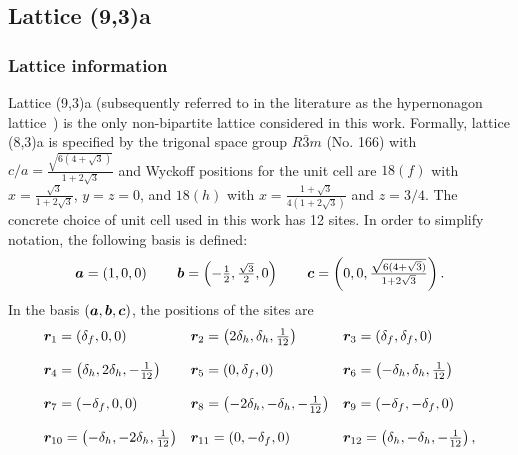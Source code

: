 %
%
\subsection{Lattice (9,3)a}
\label{section:chapter05_9_3a}
%
%
\subsubsection{Lattice information}
%
%
Lattice (9,3)a (subsequently referred to in the literature as the hypernonagon lattice~\cite{YasuyukiPRB2017,KatoPB2018,MasahikoPRL2018}) is the only non-bipartite lattice considered in this work.
Formally, lattice (8,3)a is specified by the trigonal space group $R\bar{3}m$ (No. 166) with $c/a = \frac{\sqrt{6(4 + \sqrt{3})}}{1 + 2\sqrt{3}}$ and Wyckoff positions for the unit cell are $18(f)$ with $x = \frac{\sqrt{3}}{1 + 2\sqrt{3}}$, $y = z = 0$, and $18(h)$ with $x = \frac{1 + \sqrt{3}}{4(1 + 2\sqrt{3})}$ and $z = 3/4$.
The concrete choice of unit cell used in this work has 12 sites.
In order to simplify notation, the following basis is defined:
%
\begin{equation}
	\begin{matrix*}[l]
		\ba = \left(1, 0, 0\right) \qquad
		\bb = \left(-\frac{1}{2}, \frac{\sqrt{3}}{2}, 0\right) \qquad
		\bc = \left(0, 0, \frac{\sqrt{6(4 + \sqrt{3})}}{1 + 2\sqrt{3}}\right).
	\end{matrix*}
\end{equation}
%
In the basis $(\bm{a}, \bm{b}, \bm{c})$, the positions of the sites are
%
\begin{equation}
	\begin{matrix*}[l]
		\br_{1} = \left(\delta_f, 0, 0\right) &
		\br_{2} = \left(2\delta_h, \delta_h, \frac{1}{12}\right) &
		\br_{3} = \left(\delta_f, \delta_f, 0\right) \\
		&\\
		\br_{4} = \left(\delta_h, 2\delta_h, -\frac{1}{12}\right) &
		\br_{5} = \left(0, \delta_f, 0\right) &
		\br_{6} = \left(-\delta_h, \delta_h, \frac{1}{12}\right) \\
		&\\
		\br_{7} = \left(-\delta_f, 0, 0\right) &
		\br_{8} = \left(-2\delta_h, -\delta_h, -\frac{1}{12}\right) &
		\br_{9} = \left(-\delta_f, -\delta_f, 0\right) \\
		&\\
		\br_{10} = \left(-\delta_h, -2\delta_h, \frac{1}{12}\right) &
		\br_{11} = \left(0, -\delta_f, 0\right) &
		\br_{12} = \left(\delta_h, -\delta_h, -\frac{1}{12}\right),
	\end{matrix*}
\end{equation}
